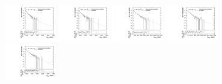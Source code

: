 \begin{figure}[htbp]
  \centering
  \includegraphics[width=0.2\textwidth]{fig/2Dfit/templateVsReco_res_r0_MVV_mu_HP_nobb_LDy.pdf}
  \includegraphics[width=0.2\textwidth]{fig/2Dfit/templateVsReco_res_r0_MVV_e_HP_nobb_LDy.pdf}
  \includegraphics[width=0.2\textwidth]{fig/2Dfit/templateVsReco_res_r0_MVV_mu_LP_nobb_LDy.pdf}
  \includegraphics[width=0.2\textwidth]{fig/2Dfit/templateVsReco_res_r0_MVV_e_LP_nobb_LDy.pdf}\\
  \includegraphics[width=0.2\textwidth]{fig/2Dfit/templateVsReco_res_r0_MVV_mu_HP_nobb_HDy.pdf}

\end{figure}
